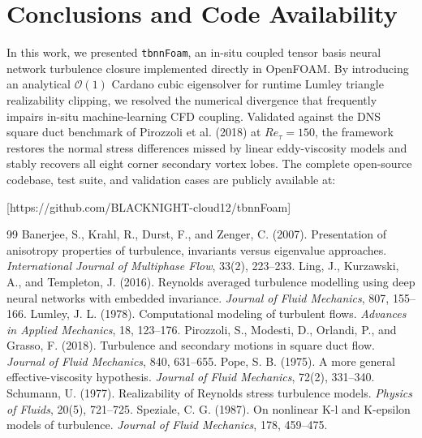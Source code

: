 \documentclass[11pt,a4paper]{article}
\begin{document}
\section{Conclusions and Code Availability}
In this work, we presented \texttt{tbnnFoam}, an in-situ coupled tensor basis neural network turbulence closure implemented directly in OpenFOAM. By introducing an analytical $\mathcal{O}(1)$ Cardano cubic eigensolver for runtime Lumley triangle realizability clipping, we resolved the numerical divergence that frequently impairs in-situ machine-learning CFD coupling. Validated against the DNS square duct benchmark of Pirozzoli et al. (2018) at $Re_\tau = 150$, the framework restores the normal stress differences missed by linear eddy-viscosity models and stably recovers all eight corner secondary vortex lobes. The complete open-source codebase, test suite, and validation cases are publicly available at:
\begin{center}
[https://github.com/BLACKNIGHT-cloud12/tbnnFoam]
\end{center}

\begin{thebibliography}{99}
\setlength{\itemsep}{1pt}\setlength{\parskip}{0pt}
\small
{} Banerjee, S., Krahl, R., Durst, F., and Zenger, C. (2007). Presentation of anisotropy properties of turbulence, invariants versus eigenvalue approaches. \textit{International Journal of Multiphase Flow}, 33(2), 223--233.
 Ling, J., Kurzawski, A., and Templeton, J. (2016). Reynolds averaged turbulence modelling using deep neural networks with embedded invariance. \textit{Journal of Fluid Mechanics}, 807, 155--166.
 Lumley, J. L. (1978). Computational modeling of turbulent flows. \textit{Advances in Applied Mechanics}, 18, 123--176.
 Pirozzoli, S., Modesti, D., Orlandi, P., and Grasso, F. (2018). Turbulence and secondary motions in square duct flow. \textit{Journal of Fluid Mechanics}, 840, 631--655.
 Pope, S. B. (1975). A more general effective-viscosity hypothesis. \textit{Journal of Fluid Mechanics}, 72(2), 331--340.
 Schumann, U. (1977). Realizability of Reynolds stress turbulence models. \textit{Physics of Fluids}, 20(5), 721--725.
 Speziale, C. G. (1987). On nonlinear K-l and K-epsilon models of turbulence. \textit{Journal of Fluid Mechanics}, 178, 459--475.
\end{thebibliography}
\end{document}

